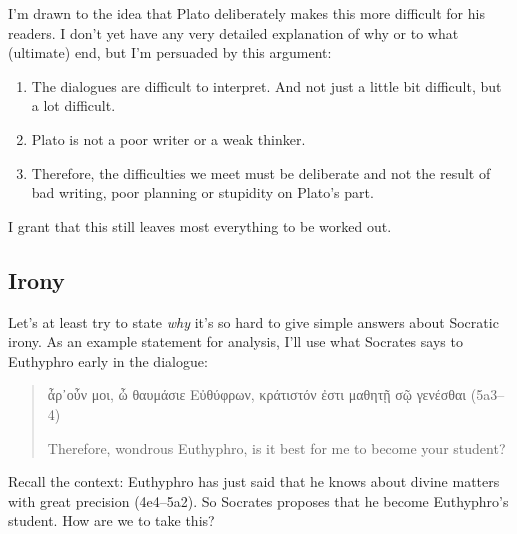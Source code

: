 \documentclass[11pt]{article}
\begin{document}
I'm drawn to the idea that Plato deliberately makes this more difficult for his readers.  I don't yet have any very detailed explanation of why or to what (ultimate) end, but I'm persuaded by this argument:

\begin{enumerate}

    \item The dialogues are difficult to interpret.  And not just a little bit difficult, but a lot difficult.

    \item Plato is not a poor writer or a weak thinker.

    \item Therefore, the difficulties we meet must be deliberate and not the result of bad writing, poor planning or stupidity on Plato's part.

\end{enumerate}

I grant that this still leaves most everything to be worked out.


\subsection{Irony}

Let's at least try to state \emph{why} it's so hard to give simple answers about Socratic irony.  As an example statement for analysis, I'll use what Socrates says to Euthyphro early in the dialogue:

\begin{quote}

    {\g
    ἆρ᾽οὖν μοι, ὦ θαυμάσιε Εὐθύφρων, κράτιστόν ἐστι μαθητῇ σῷ γενέσθαι
    } (5a3--4)

    Therefore, wondrous Euthyphro, is it best for me to become your student?

\end{quote}

Recall the context: Euthyphro has just said that he knows about divine matters with great precision (4e4--5a2).  So Socrates proposes that he become Euthyphro's student.  How are we to take this?
\end{document}
